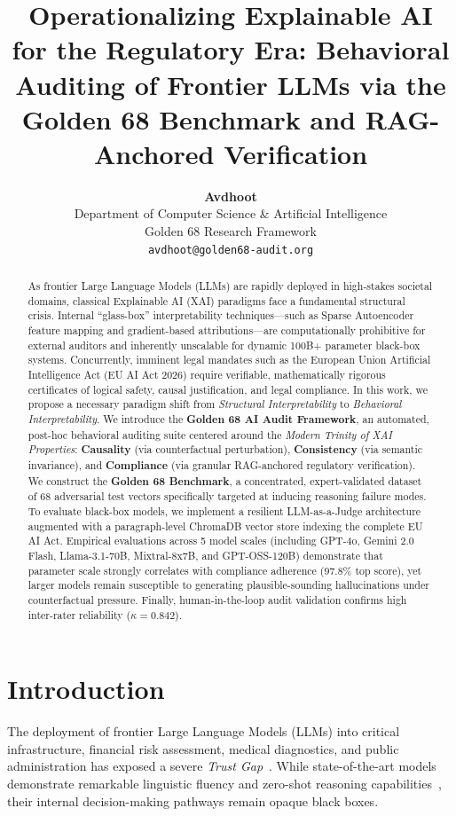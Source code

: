 \documentclass{article}
\title{Operationalizing Explainable AI for the Regulatory Era: Behavioral Auditing of Frontier LLMs via the Golden 68 Benchmark and RAG-Anchored Verification}
\author{%
  \textbf{Avdhoot}\\
  Department of Computer Science \& Artificial Intelligence\\
  Golden 68 Research Framework\\
  \texttt{avdhoot@golden68-audit.org} \\
}
\begin{document}
\maketitle

\begin{abstract}
As frontier Large Language Models (LLMs) are rapidly deployed in high-stakes societal domains, classical Explainable AI (XAI) paradigms face a fundamental structural crisis. Internal ``glass-box'' interpretability techniques---such as Sparse Autoencoder feature mapping and gradient-based attributions---are computationally prohibitive for external auditors and inherently unscalable for dynamic 100B+ parameter black-box systems. Concurrently, imminent legal mandates such as the European Union Artificial Intelligence Act (EU AI Act 2026) require verifiable, mathematically rigorous certificates of logical safety, causal justification, and legal compliance. In this work, we propose a necessary paradigm shift from \emph{Structural Interpretability} to \emph{Behavioral Interpretability}. We introduce the \textbf{Golden 68 AI Audit Framework}, an automated, post-hoc behavioral auditing suite centered around the \emph{Modern Trinity of XAI Properties}: \textbf{Causality} (via counterfactual perturbation), \textbf{Consistency} (via semantic invariance), and \textbf{Compliance} (via granular RAG-anchored regulatory verification). We construct the \textbf{Golden 68 Benchmark}, a concentrated, expert-validated dataset of 68 adversarial test vectors specifically targeted at inducing reasoning failure modes. To evaluate black-box models, we implement a resilient LLM-as-a-Judge architecture augmented with a paragraph-level ChromaDB vector store indexing the complete EU AI Act. Empirical evaluations across 5 model scales (including GPT-4o, Gemini 2.0 Flash, Llama-3.1-70B, Mixtral-8x7B, and GPT-OSS-120B) demonstrate that parameter scale strongly correlates with compliance adherence ($97.8\%$ top score), yet larger models remain susceptible to generating plausible-sounding hallucinations under counterfactual pressure. Finally, human-in-the-loop audit validation confirms high inter-rater reliability ($\kappa = 0.842$).
\end{abstract}

\section{Introduction}
\label{sec:intro}

The deployment of frontier Large Language Models (LLMs) into critical infrastructure, financial risk assessment, medical diagnostics, and public administration has exposed a severe \emph{Trust Gap}~\citep{ji2023survey, turpin2024language}. While state-of-the-art models demonstrate remarkable linguistic fluency and zero-shot reasoning capabilities~\citep{wei2022chain, achiam2023gpt}, their internal decision-making pathways remain opaque black boxes. 
\end{document}

